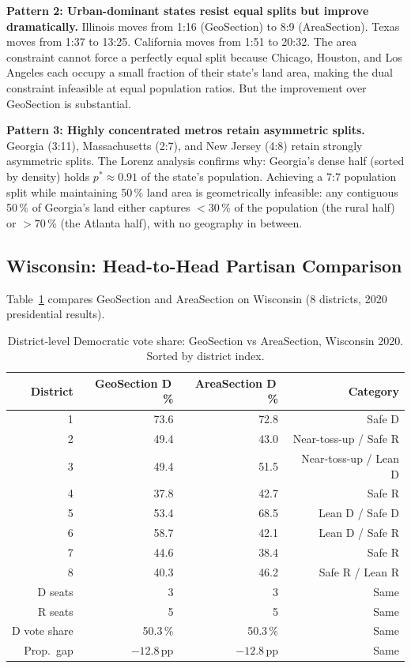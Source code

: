 \noindent\textbf{Pattern 2: Urban-dominant states resist equal splits but
improve dramatically.}
Illinois moves from 1:16 (GeoSection) to 8:9 (AreaSection).
Texas moves from 1:37 to 13:25.
California moves from 1:51 to 20:32.
The area constraint cannot force a perfectly equal split because Chicago,
Houston, and Los Angeles each occupy a small fraction of their state's land area,
making the dual constraint infeasible at equal population ratios.
But the improvement over GeoSection is substantial.

\noindent\textbf{Pattern 3: Highly concentrated metros retain asymmetric splits.}
Georgia (3:11), Massachusetts (2:7), and New Jersey (4:8) retain strongly
asymmetric splits.
The Lorenz analysis confirms why: Georgia's dense half (sorted by density)
holds $p^* \approx 0.91$ of the state's population.
Achieving a 7:7 population split while maintaining 50\,\% land area is
geometrically infeasible: any contiguous 50\,\% of Georgia's land either
captures $<30$\,\% of the population (the rural half) or $>70$\,\% (the
Atlanta half), with no geography in between.

\subsection{Wisconsin: Head-to-Head Partisan Comparison}

Table~\ref{tab:wi-partisan} compares GeoSection and AreaSection on Wisconsin
(8 districts, 2020 presidential results).

\begin{table}[h]
\centering
\caption{District-level Democratic vote share: GeoSection vs AreaSection,
Wisconsin 2020. Sorted by district index.}
\label{tab:wi-partisan}
\begin{tabular}{rrrr}
\toprule
District & GeoSection D\,\% & AreaSection D\,\% & Category \\
\midrule
1 & 73.6 & 72.8 & Safe D \\
2 & 49.4 & 43.0 & Near-toss-up / Safe R \\
3 & 49.4 & 51.5 & Near-toss-up / Lean D \\
4 & 37.8 & 42.7 & Safe R \\
5 & 53.4 & 68.5 & Lean D / Safe D \\
6 & 58.7 & 42.1 & Lean D / Safe R \\
7 & 44.6 & 38.4 & Safe R \\
8 & 40.3 & 46.2 & Safe R / Lean R \\
\midrule
D seats & 3 & 3 & Same \\
R seats & 5 & 5 & Same \\
D vote share & 50.3\,\% & 50.3\,\% & Same \\
Prop.\ gap & $-12.8$\,pp & $-12.8$\,pp & Same \\
\bottomrule
\end{tabular}
\end{table}

